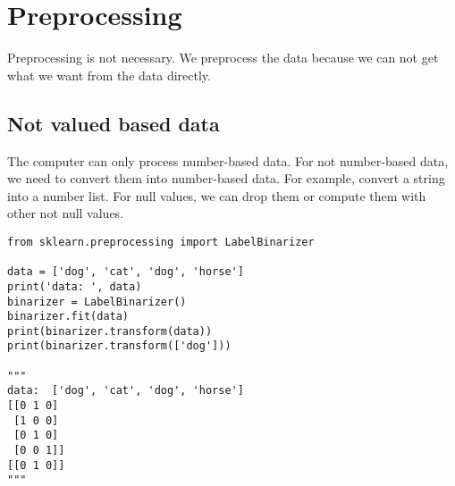 
\chapter{Preprocessing}
\label{cha:preprocessing}

Preprocessing is not necessary.
We preprocess the data because we can not get what we want from the data directly.


\section{Not valued based data}
\label{sec:not-valued-based}

The computer can only process number-based data.
For not number-based data, we need to convert them into number-based data.
For example, convert a string into a number list.
For null values, we can drop them or compute them with other not null values.



\begin{lstlisting}
from sklearn.preprocessing import LabelBinarizer

data = ['dog', 'cat', 'dog', 'horse']
print('data: ', data)
binarizer = LabelBinarizer()
binarizer.fit(data)
print(binarizer.transform(data))
print(binarizer.transform(['dog']))

"""
data:  ['dog', 'cat', 'dog', 'horse']
[[0 1 0]
 [1 0 0]
 [0 1 0]
 [0 0 1]]
[[0 1 0]]
"""
\end{lstlisting}



